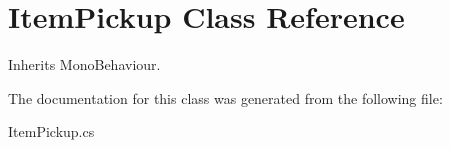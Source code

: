 \hypertarget{class_item_pickup}{}\section{Item\+Pickup Class Reference}
\label{class_item_pickup}


Inherits Mono\+Behaviour.



The documentation for this class was generated from the following file\+:\begin{DoxyCompactItemize}
\item 
Item\+Pickup.\+cs\end{DoxyCompactItemize}
